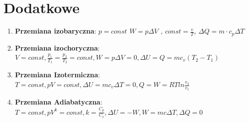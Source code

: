 \documentclass[12pt,twoside,a4paper]{book}
\begin{document}
\chapter{Dodatkowe}
\begin{enumerate}[label=(\alph*)]
\item\textbf{Przemiana izobaryczna}: \textit{$p=const$ $W=p \Delta V$ , $const=\frac{v}{T}$, $\Delta Q = m \cdot c_p \Delta T$}
\item\textbf{Przemiana izochoryczna}: \textit{$V=const, \frac{p_1}{T_1}=\frac{p_2}{T_2}=const, W=p\Delta V=0, \Delta U=Q=mc_v(T_2-T_1)$}
\item\textbf{Przemiana Izotermiczna}: \textit{$T=const, pV=const, \Delta U =mc_v\Delta T=0, Q=W=RTln\frac{v_2}{v_1} $}
\item\textbf{Przemiana Adiabatyczna}: \textit{$T=const, pV^k=const, k=\frac{C_p}{C_v}, \Delta U=-W, W=mc\Delta T, \Delta Q=0 $}
\end{enumerate}
\end{document}
